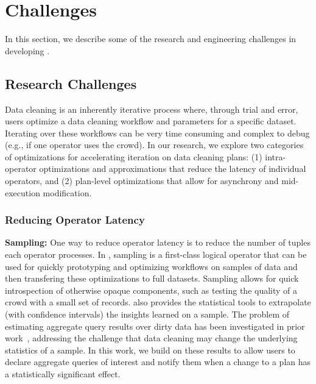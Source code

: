 \section{Challenges}
In this section, we describe some of the research and engineering challenges in developing \sys.

\subsection{Research Challenges}
Data cleaning is an inherently iterative process where, through trial and error, users optimize a data cleaning workflow and parameters for a specific dataset.
Iterating over these workflows can be very time consuming and complex to debug (e.g., if one operator uses the crowd).
In our research, we explore two categories of optimizations for accelerating iteration on data cleaning plans: (1) intra-operator optimizations and approximations that reduce the latency of individual operators, and (2) plan-level optimizations that allow for asynchrony and mid-execution modification.

\vspace{-0.2cm}
\subsubsection{Reducing Operator Latency}
\vspace{.2em}

{\noindent \bf Sampling:} One way to reduce operator latency is to reduce the number of tuples each operator processes.
In \sys, sampling is a first-class logical operator that can be used for quickly prototyping and optimizing workflows on samples of data and then transfering these optimizations to full datasets.
Sampling allows for quick introspection of otherwise opaque components, such as testing the quality of a crowd with a small set of records.
\sys also provides the statistical tools to extrapolate (with confidence intervals) the insights learned on a sample.
The problem of estimating aggregate query results over dirty data has been investigated in prior work~\cite{wang1999sample}, 
addressing the challenge that data cleaning may change the underlying statistics of a sample.
In this work, we build on these results to allow users to declare aggregate queries of interest and notify them when a change to 
a plan has a statistically significant effect.

